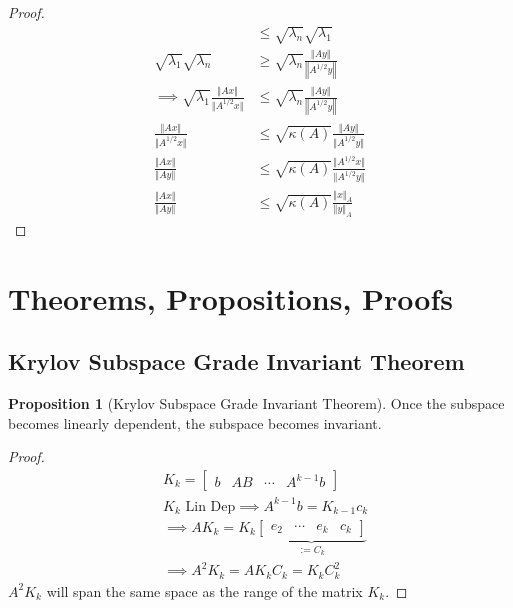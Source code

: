 \documentclass[]{article}
\theoremstyle{definition}
\newtheorem{prop}{Proposition}[section]  %
\begin{document}
\begin{appendices}
\begin{proof}
\begin{align}
                & \le \sqrt{\lambda_n}\sqrt{\lambda_1}
                \\
                \sqrt{\lambda_1}\sqrt{\lambda_n}& \ge \sqrt{\lambda_n} \frac{\Vert Ay\Vert}{\left\Vert
                    A^{1/2}y
                \right\Vert}
                \\
                \implies 
                \sqrt{\lambda_1}\frac{\Vert Ax\Vert}{\Vert A^{1/2}x \Vert} & \le 
                \sqrt{\lambda_n} \frac{\Vert Ay\Vert}{\left\Vert
                    A^{1/2}y
                \right\Vert}
                \\
                \frac{\Vert Ax\Vert}{\Vert A^{1/2}x\Vert} &\le 
                \sqrt{\kappa(A)} 
                \frac{\Vert Ay\Vert}{\Vert A^{1/2}y\Vert}
                \\
                \frac{\Vert Ax\Vert}{\Vert Ay\Vert} &\le 
                \sqrt{\kappa(A)} 
                \frac{\Vert A^{1/2}x\Vert}{\Vert A^{1/2}y\Vert}
                \\
                \frac{\Vert Ax\Vert}{\Vert Ay\Vert} &\le 
                \sqrt{\kappa(A)} 
                \frac{\Vert x\Vert_A}{\Vert y\Vert_A}
            \end{align}
        \end{proof}
    \section{Theorems, Propositions, Proofs}
        \subsection{Krylov Subspace Grade Invariant Theorem}
            \begin{prop}[Krylov Subspace Grade Invariant Theorem]\label{prop:Krylov_Subspace_Grade_Invariant_Theorem}
                Once the subspace becomes linearly dependent, the subspace becomes invariant. 
            \end{prop}
            \begin{proof}
                \begin{align}
                    & K_k = \begin{bmatrix}
                        b & AB & \cdots & A^{k - 1}b
                    \end{bmatrix}
                    \\
                    & K_k \text{ Lin Dep} \implies A^{k-1}b = K_{k - 1}c_k
                    \\
                    & \implies 
                    AK_k = K_k
                        \underbrace{\begin{bmatrix}
                            e_2 & \cdots & e_k & c_k
                        \end{bmatrix}}_{:= C_k}
                    \\
                    & \implies 
                    A^2K_k = AK_kC_k = K_kC_k^2
                \end{align}
                $A^2K_k$ will span the same space as the range of the matrix $K_k$.
            \end{proof}

\end{appendices}
\end{document}

